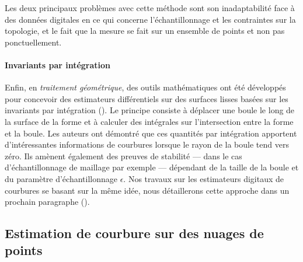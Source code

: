 Les deux principaux problèmes avec cette méthode sont son inadaptabilité face à
des données digitales en ce qui concerne l'échantillonnage et les contraintes
sur la topologie, et le fait que la mesure se fait sur un ensemble de
points et non pas ponctuellement.
%
\paragraph{Invariants par intégration}
%
Enfin, en \emph{traitement géométrique}, des outils mathématiques ont été
développés pour concevoir des estimateurs différentiels sur des surfaces lisses
basées sur les invariants par intégration
(). Le principe consiste à
déplacer une boule le long de la surface de la forme et à calculer des
intégrales sur l'intersection entre la forme et la boule. Les auteurs ont
démontré que ces quantités par intégration apportent d'intéressantes
informations de courbures lorsque le rayon de la boule tend vers zéro. Ils
amènent également des preuves de stabilité --- dans le cas d'échantillonnage de
maillage par exemple --- dépendant de la taille de la boule et du paramètre
d'échantillonnage $\epsilon$. Nos travaux sur les estimateurs digitaux de
courbures se basant sur la même idée, nous détaillerons cette approche dans un
prochain paragraphe ().
%
\subsection{Estimation de courbure sur des nuages de points}
%

